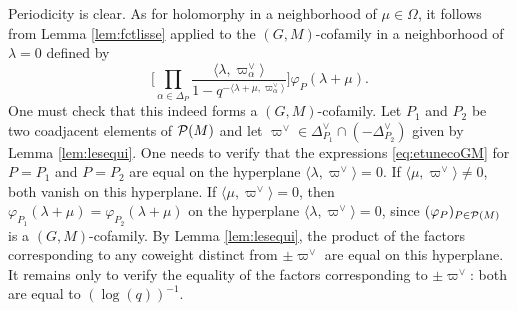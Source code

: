 \begin{paragr}
\begin{preuve}
Periodicity is clear. As for holomorphy in a neighborhood of $\mu\in \Omega$, it follows from Lemma \ref{lem:fctlisse} applied to the $(G,M)$-cofamily in a neighborhood of $\lambda=0$ defined by
\begin{equation}
    \label{eq:etunecoGM}
    \Biggl[\prod_{\alpha\in \Delta_P} \frac{\langle \lambda,\varpi_\alpha^\vee \rangle }{ 1-q^{-\langle \lambda+\mu,\varpi_\alpha^\vee \rangle}}\Biggr] \varphi_P(\lambda+\mu).
\end{equation}
One must check that this indeed forms a $(G,M)$-cofamily. Let $P_1$ and $P_2$ be two coadjacent elements of $\mathcal{P}(M)$ and let $\varpi^\vee\in \Delta_{P_1}^\vee \cap (-\Delta_{P_2}^\vee)$ given by Lemma \ref{lem:lesequi}. One needs to verify that the expressions \eqref{eq:etunecoGM} for $P=P_1$ and $P=P_2$ are equal on the hyperplane $\langle \lambda,\varpi^\vee\rangle=0$. If $\langle \mu,\varpi^\vee\rangle\neq 0$, both vanish on this hyperplane. If $\langle \mu,\varpi^\vee\rangle=0$, then $\varphi_{P_1}(\lambda+\mu)= \varphi_{P_2}(\lambda+\mu)$ on the hyperplane $\langle \lambda,\varpi^\vee\rangle=0$, since $(\varphi_P)_{P\in \mathcal{P}(M)}$ is a $(G,M)$-cofamily. By Lemma \ref{lem:lesequi}, the product of the factors corresponding to any coweight distinct from $\pm\varpi^\vee$ are equal on this hyperplane. It remains only to verify the equality of the factors corresponding to $\pm\varpi^\vee$: both are equal to $(\log(q))^{-1}$.
\end{preuve}
\end{paragr}

